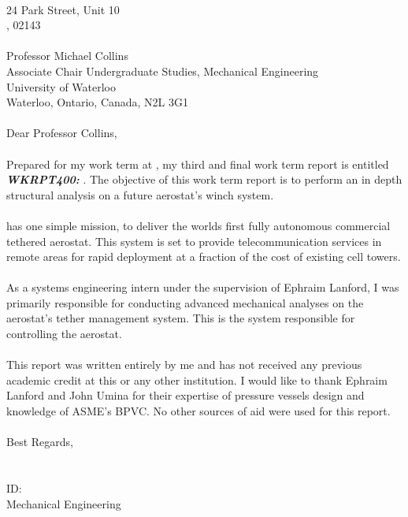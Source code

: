 \begin{declaration}

	\Company\\
	24 Park Street, Unit 10\\
	\CompanyCity , 02143\\
	\\ 
    Professor Michael Collins\\
	Associate Chair Undergraduate Studies, Mechanical Engineering\\
	University of Waterloo\\
	Waterloo, Ontario, Canada, N2L 3G1\\
	\\ 
    Dear Professor Collins,\\ 
    \\
    Prepared for my \Term work term at \textbf{\textsl{\Company}}, my third and final work term report is
	entitled \textbf{\textsl{WKRPT400: \ReportTitle}}. The objective of this work term report is to perform an in depth structural analysis on a future aerostat's winch system.\\ 
	\\
	\Company  has one simple mission, to deliver the worlds first fully autonomous commercial tethered aerostat. This system is set to provide telecommunication services in remote areas for rapid deployment at a fraction of the cost of existing cell towers.\\
	\\
	As a systems engineering intern under the supervision of Ephraim Lanford, I was primarily responsible for conducting advanced mechanical analyses on the aerostat's tether management system. This is the system responsible for controlling the aerostat.\\ 
	\\
	This report was written entirely by me and has not received any previous academic credit at this or
	any other institution. I would like to thank Ephraim Lanford and John Umina for their expertise of pressure vessels design and knowledge of ASME's BPVC. No other sources of aid were used for this report.\\ 
	\\
	Best Regards,\\
	\\
	\Seb\\
	ID: \\
	\Term Mechanical Engineering\\
	
	\thispagestyle{empty}
	
\end{declaration}
